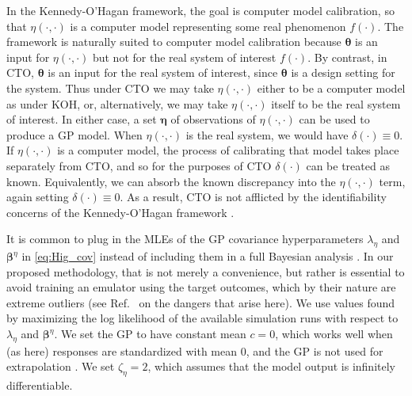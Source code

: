 \documentclass[twocolumn,10pt]{asme2ej}
\begin{document}
%
In the Kennedy-O'Hagan framework, the goal is computer model calibration, so that $\eta(\cdot,\cdot)$ is a computer model representing some real phenomenon $f(\cdot)$. 
%
The framework is naturally suited to computer model calibration because $\boldsymbol\theta$ is an input for $\eta(\cdot,\cdot)$ but not for the real system of interest $f(\cdot)$.
%
By contrast, in CTO, $\boldsymbol\theta$ is an input for the real system of interest, since $\boldsymbol\theta$ is a design setting for the system.
%
Thus under CTO we may take $\eta(\cdot,\cdot)$ either to be a computer model as under KOH, or, alternatively, we may take $\eta(\cdot,\cdot)$ itself to be the real system of interest.
%
In either case, a set $\boldsymbol\eta$ of observations of $\eta(\cdot,\cdot)$ can be used to produce a GP model.
%
When $\eta(\cdot,\cdot)$ is the real system, we would have $\delta(\cdot)\equiv0$.
%
If $\eta(\cdot,\cdot)$ is a computer model, the process of calibrating that model takes place separately from CTO, and so for the purposes of CTO $\delta(\cdot)$ can be treated as known.
%
Equivalently, we can absorb the known discrepancy into the $\eta(\cdot,\cdot)$ term, again setting $\delta(\cdot)\equiv0$.
%
As a result, CTO is not afflicted by the identifiability concerns of the Kennedy-O'Hagan framework \cite{Bayarri2007,Tuo2016}.
%

%
It is common to plug in the MLEs of the GP covariance hyperparameters $\lambda_\eta$ and $\boldsymbol \beta^\eta$ in \eqref{eq:Hig_cov} instead of including them in a full Bayesian analysis \cite{Kennedy2001,Santner2003a,Qian2008,Paulo2012}.
%
In our proposed methodology, that is not merely a convenience, but rather is essential 
%
%
%
%
to avoid training an emulator using the target outcomes, which by their nature are extreme outliers (see Ref.\ \cite{Liu2009} on the dangers that arise here).
%
We use values found by maximizing the log likelihood of the available simulation runs with respect to $\lambda_\eta$ and $\boldsymbol\beta^\eta$.
%
We set the GP to have constant mean $c=0$, which works well when (as here) responses are standardized with mean 0, and the GP is not used for extrapolation \cite{Bayarri2007}.
%
We set $\zeta_\eta = 2$, which assumes that the model output is infinitely differentiable.
%
\end{document}
